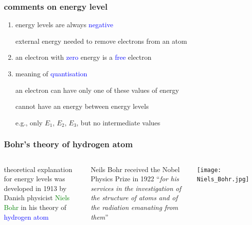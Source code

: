 \documentclass[12pt,xcolor=svgnames,handout]{beamer}
\newcommand{\tightframetitle}[1]{ %
\frametitle{#1}\vspace{-.6\baselineskip}}
\begin{document}
\begin{frame}
	\tightframetitle{comments on energy level}
	
	\begin{block}{}
		\begin{enumerate}
			\item energy levels are always \textcolor{blue}{negative} 
			
			external energy needed to remove electrons from an atom
			
			\item an electron with \textcolor{blue}{zero} energy is a \textcolor{blue}{free} electron
			
			\item meaning of \textcolor{blue}{quantisation}
			
			an electron can have only one of these values of energy
			
			cannot have an energy between energy levels
			
			e.g., only $E_1$, $E_2$, $E_3$, but no intermediate values
		\end{enumerate}
	\end{block}
	
\end{frame}

\begin{frame}
	\tightframetitle{Bohr's theory of hydrogen atom}
	
	\begin{columns}
		\begin{block}{}
			theoretical explanation for energy levels was developed in 1913 by Danish physicist \textcolor{Green}{Niels Bohr} in his theory of \textcolor{blue}{hydrogen atom}
		\end{block}
		
		\begin{block}{}
			Neils Bohr received the Nobel Physics Prize in 1922 ``\emph{for his services in the investigation of the structure of atoms and of the radiation emanating from them}''
		\end{block}
		
		\begin{block}{}
			\centering
			\texttt{[image: Niels\_Bohr.jpg]}
		\end{block}
	\end{columns}
	
	
\end{frame}
\end{document}
